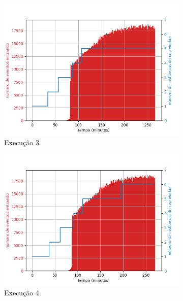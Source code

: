 \begin{figure}[h!]
\begin{subfigure}{.5\textwidth}
  \centering
  \includegraphics[width=\linewidth]{figuras/graphics/carga_e_workers_total8-dez-is.png}  
  \caption{Execução 3}
  \label{fig:cewt-8-dez-is}
\end{subfigure}
\begin{subfigure}{.5\textwidth}
  \centering
  \includegraphics[width=\linewidth]{figuras/graphics/carga_e_workers_total9-dez-is.png}  
  \caption{Execução 4}
  \label{fig:cewt-9-dez-is}
\end{subfigure}
\begin{subfigure}{.5\textwidth}
  \centering

\end{subfigure}
\end{figure}
